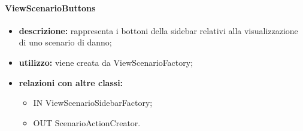 \paragraph{ViewScenarioButtons}
\begin{itemize}
	\item \textbf{descrizione:} rappresenta i bottoni della sidebar relativi alla visualizzazione di uno scenario di danno;
	\item \textbf{utilizzo:} viene creata da ViewScenarioFactory;
	\item \textbf{relazioni con altre classi:} 
	\begin{itemize}
		\item IN ViewScenarioSidebarFactory;
		\item OUT ScenarioActionCreator.
	\end{itemize}
\end{itemize}
\newpage


